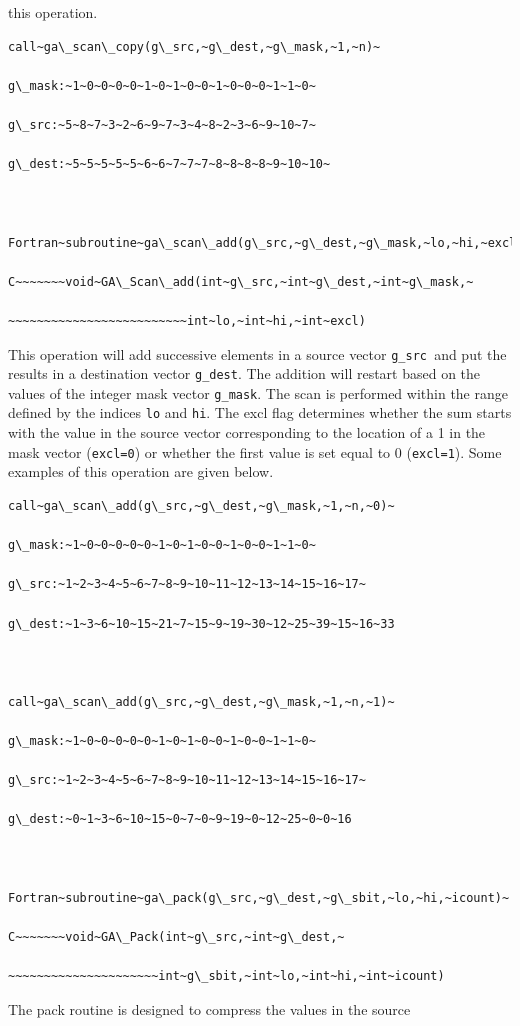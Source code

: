 this operation. 
\begin{verbatim}
call~ga\_scan\_copy(g\_src,~g\_dest,~g\_mask,~1,~n)~

g\_mask:~1~0~0~0~0~1~0~1~0~0~1~0~0~0~1~1~0~

g\_src:~5~8~7~3~2~6~9~7~3~4~8~2~3~6~9~10~7~

g\_dest:~5~5~5~5~5~6~6~7~7~7~8~8~8~8~9~10~10~



Fortran~subroutine~ga\_scan\_add(g\_src,~g\_dest,~g\_mask,~lo,~hi,~excl)~

C~~~~~~~void~GA\_Scan\_add(int~g\_src,~int~g\_dest,~int~g\_mask,~

~~~~~~~~~~~~~~~~~~~~~~~~~int~lo,~int~hi,~int~excl)
\end{verbatim}
This operation will add successive elements in a source vector \texttt{g\_src
}and put the results in a destination vector \texttt{g\_dest}. The
addition will restart based on the values of the integer mask vector
\texttt{g\_mask}. The scan is performed within the range defined by
the indices \texttt{lo} and \texttt{hi}. The excl flag determines
whether the sum starts with the value in the source vector corresponding
to the location of a 1 in the mask vector (\texttt{excl=0}) or whether
the first value is set equal to 0 (\texttt{excl=1}). Some examples
of this operation are given below.
\begin{verbatim}
call~ga\_scan\_add(g\_src,~g\_dest,~g\_mask,~1,~n,~0)~

g\_mask:~1~0~0~0~0~0~1~0~1~0~0~1~0~0~1~1~0~

g\_src:~1~2~3~4~5~6~7~8~9~10~11~12~13~14~15~16~17~

g\_dest:~1~3~6~10~15~21~7~15~9~19~30~12~25~39~15~16~33



call~ga\_scan\_add(g\_src,~g\_dest,~g\_mask,~1,~n,~1)~

g\_mask:~1~0~0~0~0~0~1~0~1~0~0~1~0~0~1~1~0~

g\_src:~1~2~3~4~5~6~7~8~9~10~11~12~13~14~15~16~17~

g\_dest:~0~1~3~6~10~15~0~7~0~9~19~0~12~25~0~0~16



Fortran~subroutine~ga\_pack(g\_src,~g\_dest,~g\_sbit,~lo,~hi,~icount)~

C~~~~~~~void~GA\_Pack(int~g\_src,~int~g\_dest,~

~~~~~~~~~~~~~~~~~~~~~int~g\_sbit,~int~lo,~int~hi,~int~icount)
\end{verbatim}
The pack routine is designed to compress the values in the source
